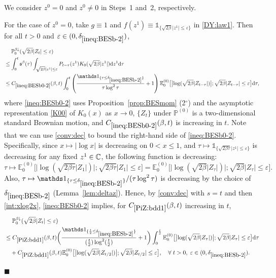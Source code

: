 \documentclass[12pt, twoside]{article}
\numberwithin{figure}{section}
\newcommand{\1}{\mathds 1}
\newcommand{\vep}{{\varepsilon}}
\newcommand{\da}{{\downarrow}}
\renewcommand{\P}{{\mathbb P}}
\newcommand{\E}{{\mathbb E}}
\renewcommand{\d}{{\mathrm d}}
\newcommand{\2}{{\mathbf 1}}
\newcommand{\s}{{\mathfrak s}}
\renewenvironment{proof}[1][\proofname]{\noindent {\bfseries #1.}\;}{\hfill\ensuremath{\blacksquare}\\}
\newcommand{\cc}{{^\circ}}
\newcommand{\deltaz}{\delta_{\ref{ineq:BESb-2}}}
\begin{document}
\begin{proof}[Proof of Lemma~\ref{lem:PiZbdd}]
We consider $z^0=0$ and $z^0\neq 0$ in Steps~1 and~2, respectively.\smallskip 

 For the case of $z^0=0$, take $g\equiv 1$ and $f(z^1)\equiv \1_{\{\sqrt{2\beta}|z^1|\leq \vep\}}$ in \eqref{DY:law1}. Then for all $t>0$ and $\vep\in (0,\deltaz)$,
\begin{align}
&\quad\;\P_{0}^{\beta\da}(\sqrt{2\beta}|Z_t|\leq \vep)\notag\\
&\leq \int_0^t \s^\beta(\tau)\int_{\sqrt{2\beta}|z^1|\leq \vep}P_{t-\tau}(z^1) K_0(\sqrt{2\beta}|z^1|)\d z^1  \d \tau\notag\\
&\leq C_{\ref{ineq:BESb0-2}}(\beta,t)\int_0^t \left(\frac{ \1_{\{  \tau\leq \deltaz\}}
}{\tau \log ^2\tau}+1
\right)\E^{(0)}_0\bigl[\bigl|\log (\sqrt{2\beta}|Z_{t-\tau}|)\bigr|;\sqrt{2\beta}|Z_{t-\tau}|\leq \vep\bigr]\d \tau,
\label{ineq:BESb0-2}
\end{align}
where \eqref{ineq:BESb0-2} uses Proposition~\ref{prop:BESmom} (2$\cc$) and the asymptotic representation \eqref{K00} of $K_0(x)$ as $x\to 0$, $\{Z_t\}$ under $\P^{(0)}$ is a two-dimensional standard Brownian motion, and $C_{\ref{ineq:BESb0-2}}(\beta,t)$ is increasing in $t$. Note that we can use \eqref{conv:dec} to bound the right-hand side of \eqref{ineq:BESb0-2}. Specifically, since $x\mapsto |\log x|$ is decreasing on $0<x\leq 1$, and $\tau\mapsto \1_{\{\sqrt{2\beta\tau}|z^1|\leq \vep\}}$ is decreasing for any fixed $z^1\in \Bbb C$, the following function is decreasing: 
\[
\tau\mapsto \E^{(0)}_0\bigl[\bigl|\log (\sqrt{2\beta\tau}|Z_{1}|)\bigr|;\sqrt{2\beta\tau }|Z_{1}|\leq \vep\bigr]=\E^{(0)}_0\bigl[\bigl|\log (\sqrt{2\beta}|Z_{\tau}|)\bigr|;\sqrt{2\beta}|Z_{\tau}|\leq \vep\bigr].
\]
Also, $\tau\mapsto  \1_{\{  \tau\leq \deltaz\}}/(\tau \log ^2\tau)$ is decreasing by the choice of $\deltaz$ (Lemma~\ref{lem:deltaz}).
Hence, by \eqref{conv:dec} with $s=t$ and then \eqref{int:xlog2x}, \eqref{ineq:BESb0-2} implies, for $C_{\ref{PiZ:bdd1}}(\beta,t)$ increasing in $t$,
\begin{align}
\begin{aligned}\label{PiZ:bdd1}
&\quad\;\P^{\beta\da}_{0}(\sqrt{2\beta}|Z_t|\leq \vep)\\
&\leq C_{\ref{PiZ:bdd1}}(\beta,t)\biggl(\frac{\1_{\{ \frac{t}{2}\leq \deltaz\}}}{(\frac{t}{2})\log^2 (\frac{t}{2})}+1\biggr)\int_0^{\frac{t}{2}} \E^{(0)}_0\bigl[\bigl|\log (\sqrt{2\beta}|Z_{\tau}|)\bigr|;\sqrt{2\beta}|Z_{\tau}|\leq \vep\bigr]\d \tau\\
&\quad +C_{\ref{PiZ:bdd1}}(\beta,t)\E^{(0)}_0\bigl[\bigl|\log (\sqrt{2\beta}|Z_{t/2}|)\bigr|;\sqrt{2\beta}|Z_{t/2}|\leq \vep\bigr],\quad \forall\;t>0,\;\vep\in (0,\deltaz).
\end{aligned}
\end{align}



\end{proof}
\end{document}
